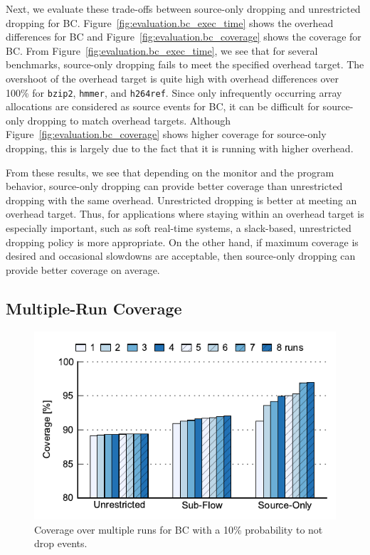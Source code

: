 Next, we evaluate these trade-offs between source-only dropping and unrestricted dropping for BC.
Figure~\ref{fig:evaluation.bc_exec_time} shows the overhead differences for BC
and Figure~\ref{fig:evaluation.bc_coverage} shows the coverage for BC.
From Figure~\ref{fig:evaluation.bc_exec_time}, we see that for several
benchmarks, source-only dropping fails to meet the specified overhead target.
The overshoot of the overhead target is quite high with overhead differences over 100\% for {\tt bzip2}, {\tt hmmer}, and {\tt h264ref}.
Since only infrequently occurring array allocations are considered as source events for BC, it can be 
difficult for source-only dropping to match overhead targets. Although
Figure~\ref{fig:evaluation.bc_coverage} shows higher coverage for
source-only dropping, this is largely due to the fact that it is running with
higher overhead.

From these results, we see that depending on the monitor and the program
behavior, source-only dropping can provide better coverage than unrestricted
dropping with the same overhead. Unrestricted dropping is better at
meeting an overhead target.
Thus, for applications where staying within an overhead target is especially
important, such as soft real-time systems, a slack-based, unrestricted dropping
policy is more appropriate. On the other hand, if maximum coverage is desired
and occasional slowdowns are acceptable, then source-only dropping can provide
better coverage on average.

\subsection{Multiple-Run Coverage}

\begin{figure}
  \begin{center}
    \includegraphics[width=\columnwidth]{figs/data_multirun_coverage.pdf}
    \vspace{-0.3in}
    \caption{Coverage over multiple runs for BC with a 10\% probability to not drop events.}
    \label{fig:evaluation.multirun}
    \vspace{-0.3in}
  \end{center}
\end{figure}

